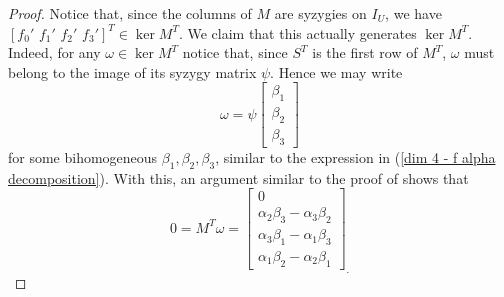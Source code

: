 \documentclass[reqno]{amsart}
\numberwithin{equation}{section}
\theoremstyle{definition}
\begin{document}
\begin{proof}
Notice that, since the columns of $M$ are syzygies on $I_U$, we have $[f_0'\,\,f_1'\,\,f_2'\,\,f_3']^T \in \ker M^T$. We claim that this actually generates $\ker M^T$. Indeed, for any $\omega\in \ker M^T$ notice that, since $S^T$ is the first row of $M^T$, $\omega$ must belong to the image of its syzygy matrix $\psi$. Hence we may write
\begin{equation}\label{omega matrix description}
\omega = \psi \left[\begin{array}{c}
    \beta_1\\
    \beta_2\\
    \beta_3
\end{array}\right]
\end{equation}
for some bihomogeneous $\beta_1, \beta_2, \beta_3$, similar to the expression in (\ref{dim 4 - f alpha decomposition}). With this, an argument similar to the proof of  shows that 
\begin{equation}\label{MT omega zero}
0 = M^T\omega = \left[\begin{array}{c}
0 \\[0.25ex]
\alpha_2\beta_3- \alpha_3\beta_2\\[0.25ex]
\alpha_3\beta_1-\alpha_1\beta_3\\[0.25ex]
\alpha_1\beta_2- \alpha_2\beta_1
\end{array}
\right]_.
\end{equation}


\end{proof}
\end{document}
